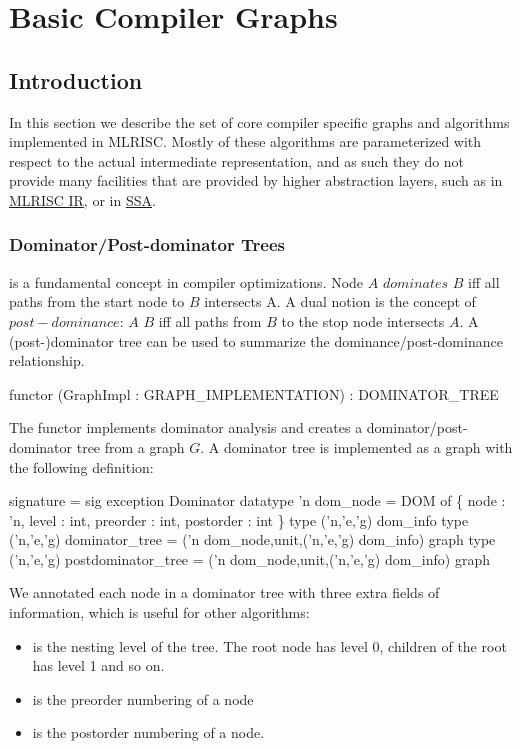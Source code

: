 \section{Basic Compiler Graphs}

\subsection{Introduction}
In this section we describe the set of core compiler specific graphs and
algorithms implemented in MLRISC.
Mostly of these algorithms are parameterized with respect
to the actual intermediate representation, and as such they
do not provide many facilities that are provided by higher abstraction
layers, such as in \href{mlrisc-ir.html}{MLRISC IR}, 
or in \href{SSA.html}{SSA}.

\subsubsection{Dominator/Post-dominator Trees}
is a fundamental concept in compiler optimizations.
Node $A$ $dominates$ $B$ 
iff all paths from the start node
to $B$ intersects A.  A dual notion is the concept of 
$post-dominance$:
$A$  $B$ iff all paths from $B$ to the stop node
intersects $A$.  A (post-)dominator tree can be used
to summarize the dominance/post-dominance relationship.

\begin{SML}
 functor 
    (GraphImpl : GRAPH_IMPLEMENTATION) : DOMINATOR_TREE
\end{SML}
   The functor implements dominator analysis and 
creates a dominator/post-dominator tree from a graph $G$.  A dominator tree is implemented as a graph
with the following definition:
\begin{SML}
 signature  = sig
    exception Dominator
    datatype 'n dom_node =
       DOM of \{ node : 'n, level : int, preorder : int, postorder : int \}
    type ('n,'e,'g) dom_info
    type ('n,'e,'g) dominator_tree = ('n dom_node,unit,('n,'e,'g) dom_info) graph
    type ('n,'e,'g) postdominator_tree = ('n dom_node,unit,('n,'e,'g) dom_info) graph
\end{SML}

We annotated each node in
a dominator tree with three extra fields of information, which
is useful for other algorithms:
\begin{itemize}
  \item{} is the nesting level of the tree.  The root
  node has level 0, children of the root has level 1 and so on.
  \item{} is the preorder numbering of a node
  \item{} is the postorder numbering of a node.
\end{itemize}

